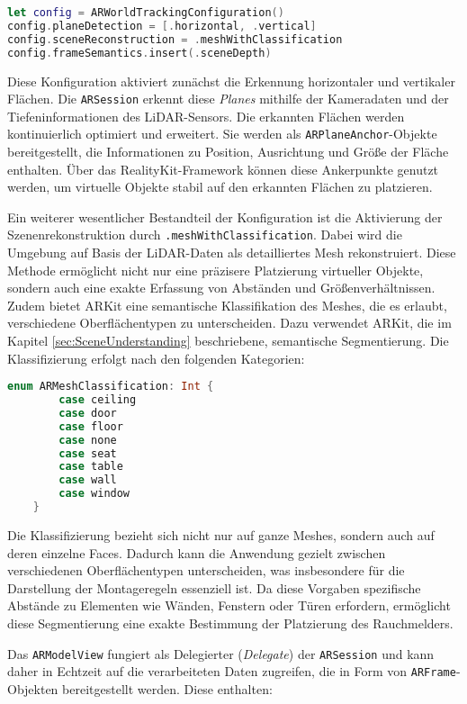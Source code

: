 \begin{lstlisting}[language=Swift]
let config = ARWorldTrackingConfiguration()
config.planeDetection = [.horizontal, .vertical]
config.sceneReconstruction = .meshWithClassification
config.frameSemantics.insert(.sceneDepth)
\end{lstlisting}

Diese Konfiguration aktiviert zunächst die Erkennung horizontaler und vertikaler Flächen. Die \texttt{ARSession} erkennt diese \textit{Planes} mithilfe der Kameradaten und der Tiefeninformationen des LiDAR-Sensors. Die erkannten Flächen werden kontinuierlich optimiert und erweitert. Sie werden als \texttt{ARPlaneAnchor}-Objekte bereitgestellt, die Informationen zu Position, Ausrichtung und Größe der Fläche enthalten. Über das RealityKit-Framework können diese Ankerpunkte genutzt werden, um virtuelle Objekte stabil auf den erkannten Flächen zu platzieren.

Ein weiterer wesentlicher Bestandteil der Konfiguration ist die Aktivierung der Szenenrekonstruktion durch \texttt{.meshWithClassification}. Dabei wird die Umgebung auf Basis der LiDAR-Daten als detailliertes Mesh rekonstruiert. Diese Methode ermöglicht nicht nur eine präzisere Platzierung virtueller Objekte, sondern auch eine exakte Erfassung von Abständen und Größenverhältnissen. Zudem bietet ARKit eine semantische Klassifikation des Meshes, die es erlaubt, verschiedene Oberflächentypen zu unterscheiden. Dazu verwendet ARKit, die im Kapitel \ref{sec:SceneUnderstanding} beschriebene, semantische Segmentierung. Die Klassifizierung erfolgt nach den folgenden Kategorien:

\begin{lstlisting}[language=Swift]
    enum ARMeshClassification: Int {
        case ceiling
        case door
        case floor
        case none
        case seat
        case table  
        case wall
        case window
    }
\end{lstlisting}

Die Klassifizierung bezieht sich nicht nur auf ganze Meshes, sondern auch auf deren einzelne Faces. Dadurch kann die Anwendung gezielt zwischen verschiedenen Oberflächentypen unterscheiden, was insbesondere für die Darstellung der Montageregeln essenziell ist. Da diese Vorgaben spezifische Abstände zu Elementen wie Wänden, Fenstern oder Türen erfordern, ermöglicht diese Segmentierung eine exakte Bestimmung der Platzierung des Rauchmelders.

Das \texttt{ARModelView} fungiert als Delegierter (\emph{Delegate}) der \texttt{ARSession} und kann daher in Echtzeit auf die verarbeiteten Daten zugreifen, die in Form von \texttt{ARFrame}-Objekten bereitgestellt werden. Diese enthalten:

